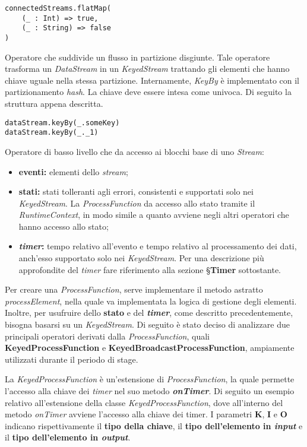 \begin{verbatim}
connectedStreams.flatMap(
    (_ : Int) => true,
    (_ : String) => false
)
\end{verbatim}

Operatore che suddivide un flusso in partizione disgiunte. Tale operatore trasforma un \textit{DataStream} in un \textit{KeyedStream} trattando gli elementi che hanno chiave uguale nella stessa partizione. Internamente, \textit{KeyBy} è implementato con il partizionamento \textit{hash}.
La chiave deve essere intesa come univoca.
Di seguito la struttura appena descritta.
\begin{verbatim}
dataStream.keyBy(_.someKey)
dataStream.keyBy(_._1)
\end{verbatim}

Operatore di basso livello che da accesso ai blocchi base di uno \textit{Stream}:
\begin{itemize}
	\item{\textbf{eventi:} elementi dello \textit{stream};}
	\item{\textbf{stati:} stati tolleranti agli errori, consistenti e supportati solo nei \textit{KeyedStream}. La \textit{ProcessFunction} da accesso allo stato tramite il \textit{RuntimeContext}, in modo simile a quanto avviene negli altri operatori che hanno accesso allo stato;}
	\item{\textbf{\textit{timer}:} tempo relativo all'evento e tempo relativo al processamento dei dati, anch'esso supportato solo nei \textit{KeyedStream}. Per una descrizione più approfondite del \textit{timer} fare riferimento alla sezione \S\textbf{Timer} sottostante.}
\end{itemize}

Per creare una \textit{ProcessFunction}, serve implementare il metodo astratto \textit{processElement}, nella quale va implementata la logica di gestione degli elementi. Inoltre, per usufruire dello \textbf{stato} e del \textbf{\textit{timer}}, come descritto precedentemente, bisogna basarsi su un \textit{KeyedStream}. Di seguito è stato deciso di analizzare due principali operatori derivati dalla \textit{ProcessFunction}, quali \textbf{KeyedProcessFunction} e \textbf{KeyedBroadcastProcessFunction}, ampiamente utilizzati durante il periodo di stage.

La \textit{KeyedProcessFunction} è un'estensione di \textit{ProcessFunction}, la quale permette l'accesso alla chiave dei \textit{timer} nel suo metodo \textbf{\textit{onTimer}}. Di seguito un esempio relativo all'estensione della classe \textit{KeyedProcessFunction}, dove all'interno del metodo \textit{onTimer} avviene l'accesso alla chiave dei timer. I parametri \textbf{K}, \textbf{I} e \textbf{O} indicano rispettivamente il \textbf{tipo della chiave}, il \textbf{tipo dell'elemento in \textit{input}} e il \textbf{tipo dell'elemento in \textit{output}}.

